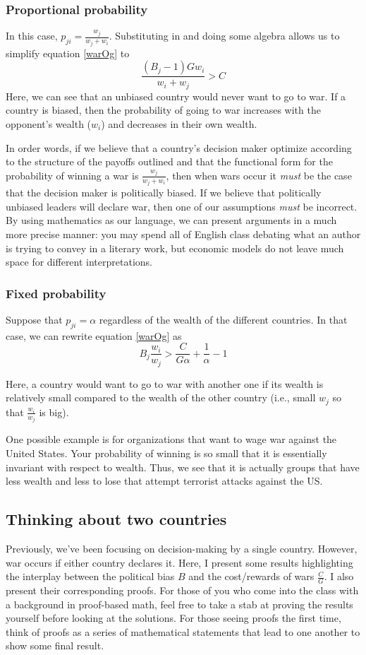 \subsubsection*{Proportional probability}
In this case, $p_{ji} = \frac{w_j}{w_j + w_i}$. Substituting in and doing some algebra allows us to simplify equation \ref{warOg} to
$$\frac{(B_{j} - 1)Gw_i}{w_i + w_j} > C$$
Here, we can see that an unbiased country would never want to go to war. If a country is biased, then the probability of going to war increases with the opponent's wealth ($w_i$) and decreases in their own wealth. 

In order words, if we believe that a country's decision maker optimize according to the structure of the payoffs outlined and that the functional form for the probability of winning a war is $\frac{w_j}{w_j + w_i}$, then when wars occur it \textit{must} be the case that the decision maker is politically biased. If we believe that politically unbiased leaders will declare war, then one of our assumptions \textit{must} be incorrect. By using mathematics as our language, we can present arguments in a much more precise manner: you may spend all of English class debating what an author is trying to convey in a literary work, but economic models do not leave much space for different interpretations.

\subsubsection*{Fixed probability}
Suppose that $p_{ji} = \alpha$ regardless of the wealth of the different countries. In that case, we can rewrite equation \ref{warOg} as 
$$B_j \frac{w_i}{w_j} > \frac{C}{G\alpha} + \frac{1}{\alpha} - 1$$

Here, a country would want to go to war with another one if its wealth is relatively small compared to the wealth of the other country (i.e., small $w_j$ so that $\frac{w_i}{w_j}$ is big). 

One possible example is for organizations that want to wage war against the United States. Your probability of winning is so small that it is essentially invariant with respect to wealth. Thus, we see that it is actually groups that have less wealth and less to lose that attempt terrorist attacks against the US. 

\subsection*{Thinking about two countries}
Previously, we've been focusing on decision-making by a single country. However, war occurs if either country declares it. Here, I present some results highlighting the interplay between the political bias $B$ and the cost/rewards of wars $\frac{C}{G}$. I also present their corresponding proofs. For those of you who come into the class with a background in proof-based math, feel free to take a stab at proving the results yourself before looking at the solutions. For those seeing proofs the first time, think of proofs as a series of mathematical statements that lead to one another to show some final result. 

